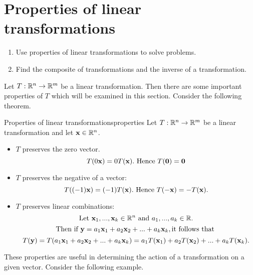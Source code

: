 \section{Properties of linear transformations}

\begin{outcome}
  \begin{enumerate}
  \item Use properties of linear transformations to solve problems.
  \item Find the composite of transformations and the inverse of a
    transformation.
  \end{enumerate}
\end{outcome}

Let $T: \mathbb{R}^n \to \mathbb{R}^m$ be a linear transformation. Then there are some important properties of $T$ which will be examined in this section. 
Consider the following theorem.

\begin{theorem}{Properties of linear transformations}{properties}
Let $T: \mathbb{R}^n \to \mathbb{R}^m$ be a linear transformation and let $\mbox{\bf x} \in \mathbb{R}^n$. 

\begin{itemize}
\item $T$ preserves the zero vector. 
\[
T(0\mbox{\bf x}) = 0 T(\mbox{\bf x}). \mbox{ Hence }T(\mbox{\bf 0}) = \mbox{\bf 0}
\]
\item $T$ preserves the negative of a vector:
\[
T( (-1)\mbox{\bf x})=(-1)T(\mbox{\bf x}). \mbox{ Hence }T(-\mbox{\bf x}) = -T(\mbox{\bf x}).
\]
\item $T$ preserves linear combinations:
\[
\mbox{Let }\mbox{\bf x}_1, ..., \mbox{\bf x}_k \in \mathbb{R}^n \mbox{ and }a_1, ..., a_k \in \mathbb{R}.
\]
\[
\mbox{Then if }\mbox{\bf y} = a_1\mbox{\bf x}_1 + a_2\mbox{\bf x}_2 + ...+a_k \mbox{\bf x}_k, \mbox{it follows that }
\]
\[
T(\mbox{\bf y}) = T(a_1\mbox{\bf x}_1 + a_2\mbox{\bf x}_2 + ...+a_k \mbox{\bf x}_k) = a_1T(\mbox{\bf x}_1) + a_2T(\mbox{\bf x}_2) + ...+a_k T(\mbox{\bf x}_k).
\] 
\end{itemize}
\end{theorem}

These properties are useful in determining the action of a transformation on a given vector. Consider the following example.

